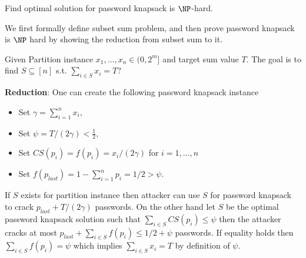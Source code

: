 
\begin{theorem}\label{appendix:ProofOfPasswordKnapsack}
Find optimal solution for password knapsack is $\NP$-hard.
\end{theorem}

We first formally define subset sum problem, and then prove password knapsack is $\NP$ hard by showing the reduction from subset sum to it.
\begin{definition}
Given Partition instance $x_1,\ldots,x_{n} \in (0,2^m]$ and target sum value $T$. The  goal is to find $S \subseteq [n]$ s.t. $\sum_{i\in S} x_i = T$? 
\end{definition}
\textbf{Reduction}: One can create the following password knapsack instance 
\begin{itemize}
\item Set $\gamma = \sum_{i=1}^n x_i$,
\item Set $\psi = T/(2\gamma )< \frac{1}{2}$,
\item Set $CS(p_i)= f(p_{i}) = x_i/(2\gamma)$ for $i=1,\ldots, n$
\item Set $f(p_{last}) = 1-\sum_{i =1}^{n} p_i = 1/2 > \psi$. 
\end{itemize}
If $S$ exists for partition instance then attacker can use $S$ for password knapsack to crack $p_{last}+T/(2\gamma)$ passwords. On the other hand let $S$ be the optimal password knapsack solution such that $\sum_{i \in S} CS(p_i) \leq \psi$ then the attacker cracks at most $p_{last}+\sum_{i \in S} f(p_i) \leq 1/2 + \psi$ passwords. If equality holds then $\sum_{i \in S} f(p_i) = \psi$ which implies $\sum_{i \in S} x_i = T$ by definition of $\psi$.


